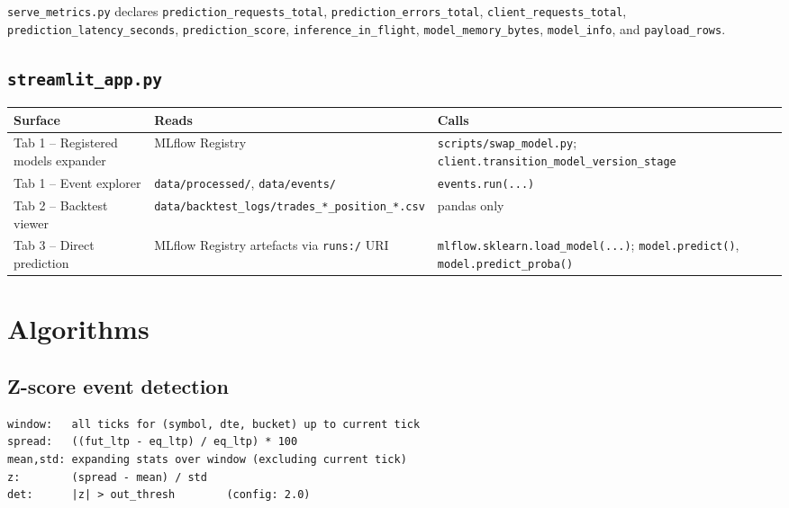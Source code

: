\documentclass[11pt,a4paper]{article}
\begin{document}
\texttt{serve\_metrics.py} declares \texttt{prediction\_requests\_total}, \texttt{prediction\_errors\_total}, \texttt{client\_requests\_total}, \texttt{prediction\_latency\_seconds}, \texttt{prediction\_score}, \texttt{inference\_in\_flight}, \texttt{model\_memory\_bytes}, \texttt{model\_info}, and \texttt{payload\_rows}.

\subsection{\texttt{streamlit\_app.py}}
\begin{tabularx}{\linewidth}{@{}lXX@{}}
\toprule
\textbf{Surface} & \textbf{Reads} & \textbf{Calls} \\
\midrule
Tab 1 -- Registered models expander  & MLflow Registry                                                & \texttt{scripts/swap\_model.py}; \texttt{client.transition\_model\_version\_stage} \\
Tab 1 -- Event explorer              & \texttt{data/processed/}, \texttt{data/events/}                & \texttt{events.run(...)} \\
Tab 2 -- Backtest viewer             & \texttt{data/backtest\_logs/trades\_*\_position\_*.csv}        & pandas only \\
Tab 3 -- Direct prediction           & MLflow Registry artefacts via \texttt{runs:/} URI              & \texttt{mlflow.sklearn.load\_model(...)}; \texttt{model.predict()}, \texttt{model.predict\_proba()} \\
\bottomrule
\end{tabularx}

\section{Algorithms}

\subsection{Z-score event detection}
\begin{lstlisting}[style=bashstyle]
window:   all ticks for (symbol, dte, bucket) up to current tick
spread:   ((fut_ltp - eq_ltp) / eq_ltp) * 100
mean,std: expanding stats over window (excluding current tick)
z:        (spread - mean) / std
det:      |z| > out_thresh        (config: 2.0)
\end{lstlisting}
\end{document}
